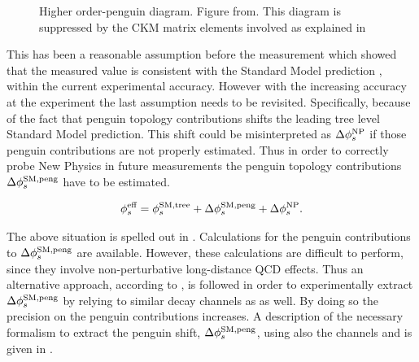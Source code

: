 \begin{figure}[!h]
  \centering
  {\sffamily }
  \caption{ Higher order-penguin diagram. Figure from\cite{jeroenThesis}. This diagram is suppressed by the CKM matrix elements involved as explained in }
  \label{bs2jpsiphi_peng}
\end{figure}

This has been a reasonable assumption before the \lhcb measurement which showed that the measured  value is consistent with the Standard
Model prediction , within the current experimental accuracy. However with the increasing accuracy at the \lhcb experiment the last assumption needs to be revisited.
Specifically, because of the fact that penguin topology contributions shifts the leading tree level Standard Model prediction.
This shift could be misinterpreted as $\Delta\phi_{s}^{\tiny\text {NP}}$ if those penguin contributions are not properly estimated.
Thus in order to correctly probe New Physics in future measurements the penguin topology contributions $\Delta\phi_{s}^{\tiny\text {SM,peng}}$
have to be estimated.

\begin{equation}
\centering
 \phis^{\text {eff}} = \phis^{\tiny \text{SM,tree}} + \Delta\phiS{SM,peng} + \Delta\phis^{\tiny \text{NP}}.
 \label{phis_sm_peng}
\end{equation}

\noindent The above situation is spelled out in .
Calculations for the penguin contributions to $\Delta\phi_{s}^{\tiny\text {SM,peng}}$ are available\cite{Liu:2013nea,Frings:2015eva}.
However, these calculations are difficult to perform, since they involve non-perturbative long-distance QCD effects. Thus an alternative
approach, according to \cite{DeBruyn:2014oga,Frings:2015eva,Faller:2008gt,Liu:2013nea,DeBruyn-thesis}, is followed in order to experimentally extract $\Delta\phi_{s}^{\tiny\text {SM,peng}}$ by relying to
similar decay channels as \BsJpsiPhi as well. By doing so the precision on the penguin contributions increases. A description
of the necessary formalism to extract the penguin shift, $\Delta\phi_{s}^{\tiny\text {SM,peng}}$, using also the channels \BsJpsiKst and \BsJpsiRho is
given in .
